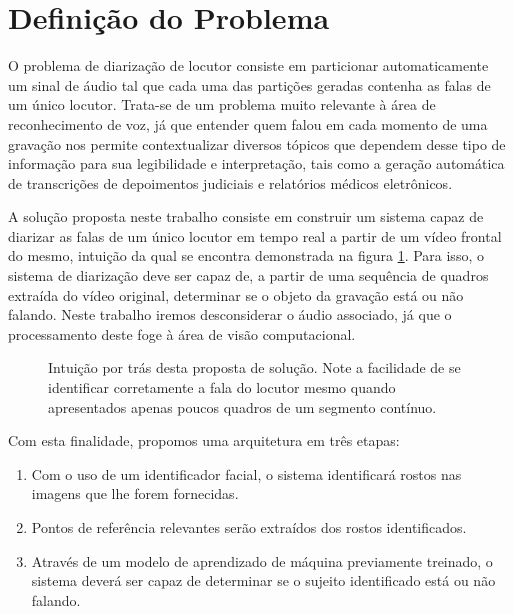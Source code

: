 \section{Definição do Problema}
\label{sec:problem-desc}

O problema de diarização de locutor consiste em particionar automaticamente um sinal de áudio tal que cada uma das partições geradas contenha as falas de um único locutor.
Trata-se de um problema muito relevante à área de reconhecimento de voz, já que entender quem falou em cada momento de uma gravação nos permite contextualizar diversos tópicos que dependem desse tipo de informação para sua legibilidade e interpretação, tais como a geração automática de transcrições de depoimentos judiciais e relatórios médicos eletrônicos.

A solução proposta neste trabalho consiste em construir um sistema capaz de diarizar as falas de um único locutor em tempo real a partir de um vídeo frontal do mesmo, intuição da qual se encontra demonstrada na figura \ref{fig:intuition}.
Para isso, o sistema de diarização deve ser capaz de, a partir de uma sequência de quadros extraída do vídeo original, determinar se o objeto da gravação está ou não falando.
Neste trabalho iremos desconsiderar o áudio associado, já que o processamento deste foge à área de visão computacional.

\begin{figure}[h]
    \centering
    \caption{Intuição por trás desta proposta de solução. Note a facilidade de se identificar corretamente a fala do locutor mesmo quando apresentados apenas poucos quadros de um segmento contínuo.}
    \label{fig:intuition}
\end{figure}

Com esta finalidade, propomos uma arquitetura em três etapas:
\begin{enumerate}
    \item Com o uso de um identificador facial, o sistema identificará rostos nas imagens que lhe forem fornecidas. 
    \item Pontos de referência relevantes serão extraídos dos rostos identificados. 
    \item Através de um modelo de aprendizado de máquina previamente treinado, o sistema deverá ser capaz de determinar se o sujeito identificado está ou não falando.
\end{enumerate}

